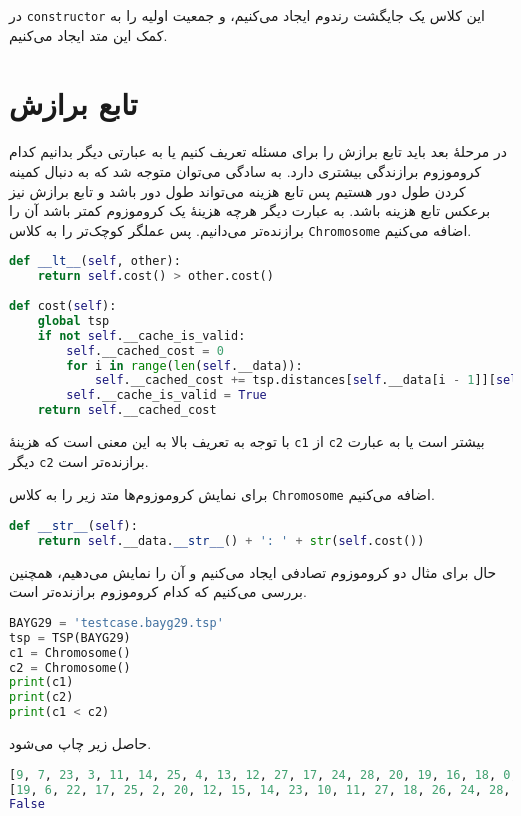 \documentclass[a4paper, 12pt]{article}
\theoremstyle{definition}
\begin{document}
در
\texttt{constructor}
این کلاس یک جایگشت رندوم ایجاد می‌کنیم، و جمعیت اولیه را به کمک این متد ایجاد می‌کنیم.

\section{تابع برازش}

در مرحلهٔ بعد باید تابع برازش را برای مسئله تعریف کنیم یا به عبارتی دیگر بدانیم کدام کروموزوم برازندگی بیشتری دارد. به سادگی می‌توان متوجه شد که به دنبال کمینه کردن طول دور هستیم پس تابع هزینه می‌تواند طول دور باشد و تابع برازش نیز برعکس تابع هزینه باشد. به عبارت دیگر هرچه هزینهٔ یک کروموزوم کمتر باشد آن را برازنده‌تر می‌دانیم. پس عملگر کوچک‌تر را به کلاس
\texttt{Chromosome}
اضافه می‌کنیم.

\LTR
\begin{lstlisting}[language=Python]
def __lt__(self, other):
    return self.cost() > other.cost()
    
def cost(self):
    global tsp
    if not self.__cache_is_valid:
        self.__cached_cost = 0
        for i in range(len(self.__data)):
            self.__cached_cost += tsp.distances[self.__data[i - 1]][self.__data[i]]
        self.__cache_is_valid = True
    return self.__cached_cost
\end{lstlisting}
\RTL

با توجه به تعریف بالا
به این معنی است که هزینهٔ
\texttt{c1}
از
\texttt{c2}
بیشتر است یا به عبارت دیگر
\texttt{c2}
برازنده‌تر است.

برای نمایش کروموزوم‌ها متد زیر را به کلاس
\texttt{Chromosome}
اضافه می‌کنیم.

\LTR
\begin{lstlisting}[language=Python]
def __str__(self):
    return self.__data.__str__() + ': ' + str(self.cost())
\end{lstlisting}
\RTL

حال برای مثال دو کروموزوم تصادفی ایجاد می‌کنیم و آن را نمایش می‌دهیم، همچنین بررسی می‌کنیم که کدام کروموزوم برازنده‌تر است.

\LTR
\begin{lstlisting}[language=Python]
BAYG29 = 'testcase.bayg29.tsp'
tsp = TSP(BAYG29)
c1 = Chromosome()
c2 = Chromosome()
print(c1)
print(c2)
print(c1 < c2)
\end{lstlisting}
\RTL

حاصل زیر چاپ می‌شود.

\LTR
\begin{lstlisting}[language=Python]
[9, 7, 23, 3, 11, 14, 25, 4, 13, 12, 27, 17, 24, 28, 20, 19, 16, 18, 0, 5, 26, 6, 15, 22, 8, 21, 1, 10, 2]: 4920
[19, 6, 22, 17, 25, 2, 20, 12, 15, 14, 23, 10, 11, 27, 18, 26, 24, 28, 9, 4, 21, 1, 8, 13, 0, 16, 5, 7, 3]: 4980
False    
\end{lstlisting}
\RTL
\end{document}

